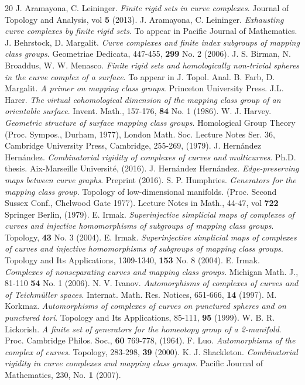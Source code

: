 \documentclass[twoside,11pt,a4paper]{article}
\begin{document}
\begin{thebibliography}{20}
  J. Aramayona, C. Leininger. \textit{Finite rigid sets in curve complexes}. Journal of Topology and Analysis, vol \textbf{5} (2013).
  J. Aramayona, C. Leininger. \textit{Exhausting curve complexes by finite rigid sets}. To appear in Pacific Journal of Mathematics.
  J. Behrstock, D. Margalit. \textit{Curve complexes and finite index subgroups of mapping class groups}. Geometriae Dedicata, 447-455, \textbf{299} No. 2 (2006).
  J. S. Birman, N. Broaddus, W. W. Menasco. \textit{Finite rigid sets and homologically non-trivial spheres in the curve complex of a surface}. To appear in J. Topol. Anal.
  B. Farb, D. Margalit. \textit{A primer on mapping class groups}. Princeton University Press.
  J.L. Harer. \textit{The virtual cohomological dimension of the mapping class group of an orientable surface}. Invent. Math., 157-176, \textbf{84} No. 1 (1986).
  W. J. Harvey. \textit{Geometric structure of surface mapping class groups}. Homological Group Theory (Proc. Sympos., Durham, 1977), London Math. Soc. Lecture Notes Ser. 36, Cambridge University Press, Cambridge, 255-269, (1979).
  J. Hern\'{a}ndez Hern\'{a}ndez. \textit{Combinatorial rigidity of complexes of curves and multicurves}. Ph.D. thesis. Aix-Marseille Universit\'{e}, (2016).
  J. Hern\'{a}ndez Hern\'{a}ndez. \textit{Edge-preserving maps between curve graphs}. Preprint (2016).
  S. P. Humphries. \textit{Generators for the mapping class group}. Topology of low-dimensional manifolds. (Proc. Second Sussex Conf., Chelwood Gate 1977). Lecture Notes in Math., 44-47, vol \textbf{722} Springer Berlin, (1979).
  E. Irmak. \textit{Superinjective simplicial maps of complexes of curves and injective homomorphisms of subgroups of mapping class groups}. Topology, \textbf{43} No. 3 (2004).
  E. Irmak. \textit{Superinjective simplicial maps of complexes of curves and injective homomorphisms of subgroups of mapping class groups}. Topology and Its Applications, 1309-1340, \textbf{153} No. 8 (2004).
  E. Irmak. \textit{Complexes of nonseparating curves and mapping class groups}. Michigan Math. J., 81-110 \textbf{54} No. 1 (2006).
  N. V. Ivanov. \textit{Automorphisms of complexes of curves and of Teichm\"{u}ller spaces}. Internat. Math. Res. Notices, 651-666, \textbf{14}  (1997).
  M. Korkmaz. \textit{Automorphisms of complexes of curves on punctured spheres and on punctured tori}. Topology and Its Applications, 85-111, \textbf{95} (1999).
  W. B. R. Lickorish. \textit{A finite set of generators for the homeotopy group of a 2-manifold}. Proc. Cambridge Philos. Soc., \textbf{60} 769-778, (1964).
  F. Luo. \textit{Automorphisms of the complex of curves}. Topology, 283-298, \textbf{39} (2000).
  K. J. Shackleton. \textit{Combinatorial rigidity in curve complexes and mapping class groups}. Pacific Journal of Mathematics, 230, No. \textbf{1} (2007).
\end{thebibliography}
\end{document}
